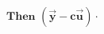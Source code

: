 \documentclass[preview]{standalone}
\begin{document}
\begin{align*}
\textbf{Then} \,\, ( \mathbf{\vec{y}} - \mathbf{c \vec{u}} ) \cdot{\quad}
\end{align*}
\end{document}
